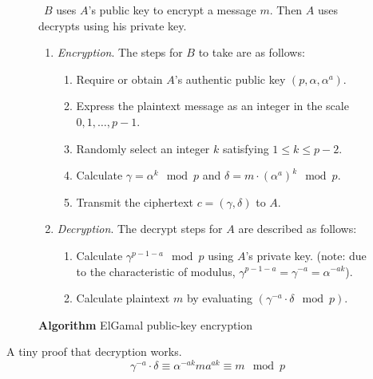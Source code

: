 \documentclass[12pt,journal,compsoc]{IEEEtran}
\begin{document}
\begin{figure}[!htbp]
  \centering
  \begin{algorithmic}
    \ENSURE~$B$ uses $A$'s public key to encrypt a message $m$. Then
    $A$ uses decrypts using his private key.
    \begin{enumerate}
    \item \emph{Encryption}. The steps for $B$ to take are as follows:
      \begin{enumerate}
      \item Require or obtain $A$'s authentic public key
        $(p,\alpha,\alpha^{a})$. 
      \item Express the plaintext message as an integer in the scale
        ${0,1,\ldots,p-1}$. 
      \item Randomly select an integer $k$ satisfying $1\leq k\leq
        p-2$.
      \item Calculate $\gamma=\alpha^{k}\mod p$ and
        $\delta=m\cdot{(\alpha^{a})}^{k}\mod p$.
      \item Transmit the ciphertext $c=(\gamma,\delta)$ to $A$.
      \end{enumerate}
    \item \emph{Decryption}. The decrypt steps for $A$ are described
      as follows:
      \begin{enumerate}
      \item Calculate $\gamma^{p-1-a}\mod p$ using $A$'s private
        key. (note: due to the characteristic of modulus,
        $\gamma^{p-1-a}=\gamma^{-a}=\alpha^{-ak}$). 
      \item Calculate plaintext $m$ by evaluating
        $(\gamma^{-a}\cdot\delta\mod p)$.
      \end{enumerate}
    \end{enumerate}
  \end{algorithmic}
  \caption{\textbf{Algorithm} ElGamal public-key encryption}
  \label{fig:basic-elgamal-public-key-encry-algo}
\end{figure}
\par
A tiny proof that decryption works.
\begin{equation}
  \label{eq:basic-elgamal-encry-algo}
  \gamma^{-a}\cdot\delta\equiv\alpha^{-ak}ma^{ak}\equiv m\mod p
\end{equation}

\end{document}
